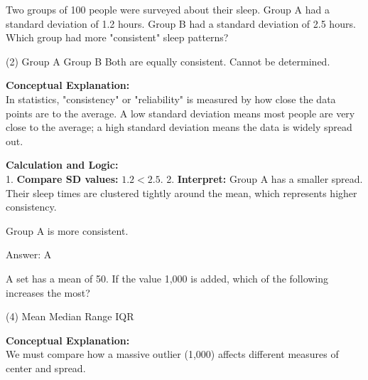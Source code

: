 \documentclass[11pt,paper=a4,answers]{exam}
\begin{document}
\begin{questions}
\vspace{60pt}

\question
Two groups of 100 people were surveyed about their sleep. Group A had a standard deviation of 1.2 hours. Group B had a standard deviation of 2.5 hours. Which group had more "consistent" sleep patterns?
\begin{tasks}(2)
    \task Group A
    \task Group B
    \task Both are equally consistent.
    \task Cannot be determined.
\end{tasks}

\begin{solution}
\textbf{Conceptual Explanation:} \\
In statistics, "consistency" or "reliability" is measured by how close the data points are to the average. A low standard deviation means most people are very close to the average; a high standard deviation means the data is widely spread out.

\vspace{30pt}

\textbf{Calculation and Logic:} \\
1. \textbf{Compare SD values:} $1.2 < 2.5$.
2. \textbf{Interpret:} Group A has a smaller spread. Their sleep times are clustered tightly around the mean, which represents higher consistency.

\vspace{20pt}

Group A is more consistent.

\vspace{30pt}

Answer: \colorbox{yellow!100}{A}
\end{solution}

\vspace{60pt}

\question
A set has a mean of 50. If the value 1,000 is added, which of the following increases the most?
\begin{tasks}(4)
    \task Mean
    \task Median
    \task Range
    \task IQR
\end{tasks}

\begin{solution}
\textbf{Conceptual Explanation:} \\
We must compare how a massive outlier (1,000) affects different measures of center and spread.


\end{solution}
\end{questions}
\end{document}
